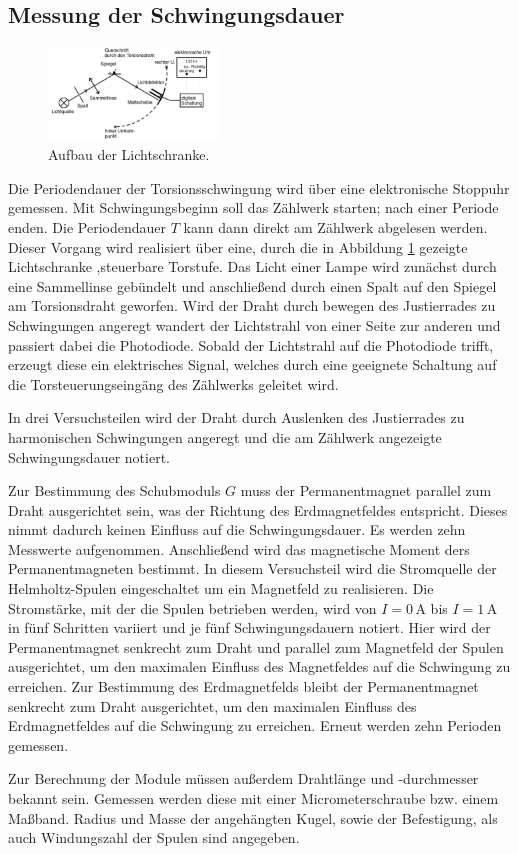 \subsection{Messung der Schwingungsdauer}
\begin{figure}
\centering
	\includegraphics[width=0.4\textwidth]{Bilder/Aufbau2.pdf}
	\caption{Aufbau der Lichtschranke.}
	\label{fig:aufbau2}
\end{figure}
Die Periodendauer der Torsionsschwingung wird über eine elektronische Stoppuhr gemessen. 
Mit Schwingungsbeginn soll das Zählwerk starten; nach einer Periode enden. Die Periodendauer $T$ kann dann direkt am Zählwerk abgelesen werden.
Dieser Vorgang wird realisiert über eine, durch die in Abbildung \ref{fig:aufbau2} gezeigte Lichtschranke ,steuerbare Torstufe. 
Das Licht einer Lampe wird zunächst durch eine Sammellinse gebündelt und anschließend durch einen Spalt auf den Spiegel am Torsionsdraht geworfen. Wird der Draht durch bewegen des Justierrades zu Schwingungen angeregt wandert der Lichtstrahl von einer Seite zur anderen und passiert dabei die Photodiode. 
Sobald der Lichtstrahl auf die Photodiode trifft, erzeugt diese ein elektrisches Signal, welches durch eine geeignete Schaltung auf die Torsteuerungseingäng des Zählwerks geleitet wird.

In drei Versuchsteilen wird der Draht durch Auslenken des Justierrades zu harmonischen Schwingungen angeregt und die am Zählwerk angezeigte Schwingungsdauer notiert.

Zur Bestimmung des Schubmoduls $G$ muss der Permanentmagnet parallel zum Draht ausgerichtet sein, was der Richtung des Erdmagnetfeldes entspricht. Dieses nimmt dadurch keinen Einfluss auf die Schwingungsdauer. Es werden zehn Messwerte aufgenommen.
Anschließend wird das magnetische Moment ders Permanentmagneten bestimmt. In diesem Versuchsteil wird die Stromquelle der Helmholtz-Spulen eingeschaltet um ein Magnetfeld zu realisieren. Die Stromstärke, mit der die Spulen betrieben werden, wird von $I=0\,\si\ampere$ bis $I=1\,\si\ampere$ in fünf Schritten variiert und je fünf Schwingungsdauern notiert.
 Hier wird der Permanentmagnet senkrecht zum Draht und parallel zum Magnetfeld der Spulen ausgerichtet, um den maximalen Einfluss des Magnetfeldes  auf die Schwingung zu erreichen.  
Zur Bestimmung des Erdmagnetfelds bleibt der Permanentmagnet senkrecht zum Draht ausgerichtet, um den maximalen Einfluss des Erdmagnetfeldes auf die Schwingung zu erreichen. Erneut werden zehn Perioden gemessen.

Zur Berechnung der Module müssen außerdem Drahtlänge und -durchmesser bekannt sein. Gemessen werden diese mit einer Micrometerschraube bzw. einem Maßband.
Radius und Masse der angehängten Kugel, sowie der Befestigung, als auch Windungszahl der Spulen sind angegeben.

